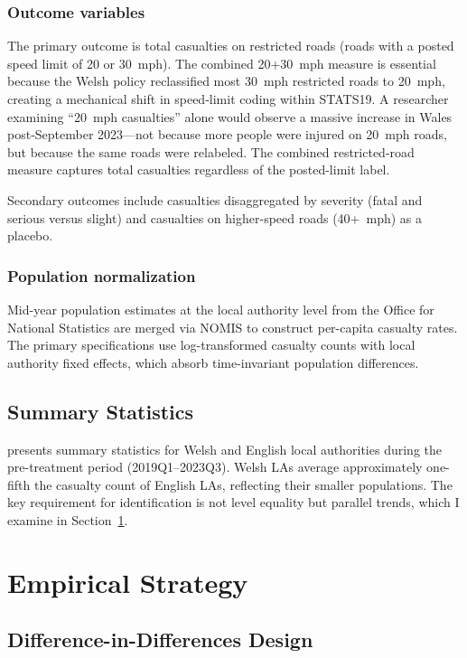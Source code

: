 \documentclass[12pt]{article}
\begin{document}
\subsubsection*{Outcome variables} The primary outcome is total casualties on restricted roads (roads with a posted speed limit of 20 or 30~mph). The combined 20+30~mph measure is essential because the Welsh policy reclassified most 30~mph restricted roads to 20~mph, creating a mechanical shift in speed-limit coding within STATS19. A researcher examining ``20~mph casualties'' alone would observe a massive increase in Wales post-September 2023---not because more people were injured on 20~mph roads, but because the same roads were relabeled. The combined restricted-road measure captures total casualties regardless of the posted-limit label.

Secondary outcomes include casualties disaggregated by severity (fatal and serious versus slight) and casualties on higher-speed roads (40+~mph) as a placebo.

\subsubsection*{Population normalization} Mid-year population estimates at the local authority level from the Office for National Statistics are merged via NOMIS to construct per-capita casualty rates. The primary specifications use log-transformed casualty counts with local authority fixed effects, which absorb time-invariant population differences.

\subsection{Summary Statistics}



 presents summary statistics for Welsh and English local authorities during the pre-treatment period (2019Q1--2023Q3). Welsh LAs average approximately one-fifth the casualty count of English LAs, reflecting their smaller populations. The key requirement for identification is not level equality but parallel trends, which I examine in Section~\ref{sec:strategy}.

\section{Empirical Strategy}
\label{sec:strategy}

\subsection{Difference-in-Differences Design}
\end{document}
